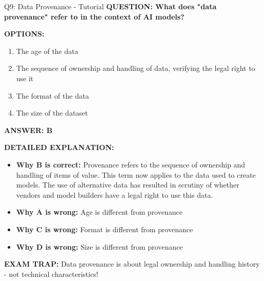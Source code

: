 \documentclass[8pt]{beamer}
\begin{document}
	\begin{frame}{Q9: Data Provenance - Tutorial}
		\fontsize{6.5}{7.5}\selectfont
		\textbf{QUESTION: What does "data provenance" refer to in the context of AI models?}
		
		\vspace{0.1cm}
		\textbf{OPTIONS:}
		\begin{enumerate}
			\item The age of the data
			\item The sequence of ownership and handling of data, verifying the legal right to use it
			\item The format of the data
			\item The size of the dataset
		\end{enumerate}
		
		\vspace{0.1cm}
		\textcolor{myblue}{\textbf{ANSWER: B}}
		
		\vspace{0.1cm}
		\textbf{DETAILED EXPLANATION:}
		\begin{itemize}
			\item \textbf{Why B is correct:} Provenance refers to the sequence of ownership and handling of items of value. This term now applies to the data used to create models. The use of alternative data has resulted in scrutiny of whether vendors and model builders have a legal right to use this data.
			\item \textbf{Why A is wrong:} Age is different from provenance
			\item \textbf{Why C is wrong:} Format is different from provenance
			\item \textbf{Why D is wrong:} Size is different from provenance
		\end{itemize}
		
		\textcolor{myred}{\textbf{EXAM TRAP:}} Data provenance is about \textcolor{myblue}{legal ownership and handling history} - not technical characteristics!
	\end{frame}
	
\end{document}
